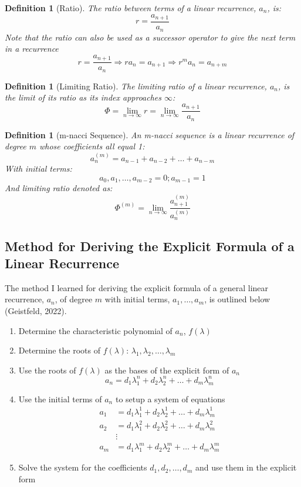 \documentclass[11pt]{article}
\newtheorem{definition}[theorem]{Definition}
\begin{document}
\begin{definition}[Ratio] The ratio between terms of a linear recurrence, $a_n$, is:
    $$r=\frac{a_{n+1}}{a_{n}}$$
    Note that the ratio can also be used as a successor operator to give the next term in a recurrence 
    $$r=\frac{a_{n+1}}{a_{n}}\Rightarrow r a_n=a_{n+1}\Rightarrow r^m a_n=a_{n+m}$$
\end{definition}

\begin{definition}[Limiting Ratio] The limiting ratio of a linear recurrence, $a_n$, is the limit of its ratio as its index approaches $\infty$:
    $$\Phi=\lim_{n\to\infty}r=\lim_{n\to\infty}\frac{a_{n+1}}{a_{n}}$$
\end{definition}

\begin{definition}[m-nacci Sequence] An m-nacci sequence is a linear recurrence of degree \(m\) whose coefficients all equal 1:
    $$a_n^{(m)}=a_{n-1}+a_{n-2}+\dots +a_{n-m}$$ 
    With initial terms: 
    $$a_0,a_1,\dots,a_{m-2}=0;a_{m-1}=1$$
    And limiting ratio denoted as: 
    \[\Phi^{(m)}=\lim_{n\to\infty} \frac{a_{n+1}^{(m)}}{a_n^{(m)}}\]
\end{definition}

\subsection{Method for Deriving the Explicit Formula of a Linear Recurrence}
The method I learned for deriving the explicit formula of a general linear recurrence, $a_n$, of degree \(m\) with initial terms, \(a_1,\dots,a_m\), is outlined below (Geistfeld, 2022).
\begin{enumerate}
    \item Determine the characteristic polynomial of $a_n$, $f(\lambda)$
    \item Determine the roots of $f(\lambda)$: $\lambda_1,\lambda_2,\dots,\lambda_m$
    \item Use the roots of $f(\lambda)$ as the bases of the explicit form of $a_n$
    \[a_n = d_1\lambda_1^n+d_2\lambda_2^n+\dots+d_m\lambda_m^n\]
    \item Use the initial terms of $a_n$ to setup a system of equations
    \begin{align*}
        a_1 &= d_1\lambda_1^1+d_2\lambda_2^1+\dots+d_m\lambda_m^1 \\
        a_2 &= d_1\lambda_1^2+d_2\lambda_2^2+\dots+d_m\lambda_m^2 \\
        &\vdots \\ 
        a_m &= d_1\lambda_1^m+d_2\lambda_2^m+\dots+d_m\lambda_m^m
    \end{align*}

    \item Solve the system for the coefficients $d_1,d_2,\dots,d_m$ and use them in the explicit form
\end{enumerate}
\end{document}
